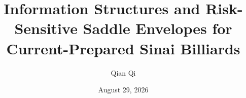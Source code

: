 \documentclass[11pt,reqno]{amsart}
\title[Information and saddle envelopes for Sinai theta limits]{Information Structures and Risk-Sensitive Saddle Envelopes for Current-Prepared Sinai Billiards}
\author{Qian Qi}
\date{August 29, 2026}
\theoremstyle{definition}
\theoremstyle{remark}
\begin{document}
\raggedbottom



\end{document}
